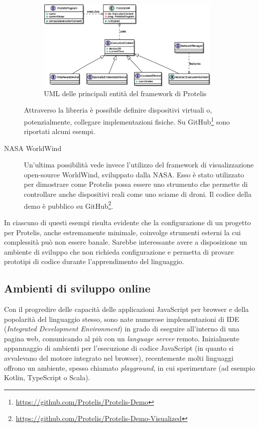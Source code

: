 \begin{description}
      \begin{figure}[htbp]
        \centering
        \includegraphics[width=0.87\textwidth]{res/uml/ExecutionContext.eps}%
        \caption{UML delle principali entità del framework di Protelis}%
        \label{fig:protelisvm}
      \end{figure}

      Attraverso la libreria è possibile definire dispositivi virtuali o, potenzialmente, collegare implementazioni fisiche.
      Su GitHub\footnote{\url{https://github.com/Protelis/Protelis-Demo}} sono riportati alcuni esempi.

    \item[NASA WorldWind]\cite{4161692}
      Un'ultima possibilità vede invece l'utilizzo del framework di visualizzazione open-source WorldWind, sviluppato dalla NASA\@.
      Esso è stato utilizzato per dimostrare come Protelis possa essere uno strumento che permette di controllare anche dispositivi reali come uno sciame di droni.
      Il codice della demo è pubblico su GitHub\footnote{\url{https://github.com/Protelis/Protelis-Demo-Visualized}}.
  \end{description}

  In ciascuno di questi esempi risulta evidente che la configurazione di un progetto per Protelis, anche estremamente minimale, coinvolge strumenti esterni la cui complessità può non essere banale.
  Sarebbe interessante avere a disposizione un ambiente di sviluppo che non richieda configurazione e permetta di provare prototipi di codice durante l'apprendimento del linguaggio.

  \subsection{Ambienti di sviluppo online}\label{subsec:online-ide}

  Con il progredire delle capacità delle applicazioni JavaScript per browser e della popolarità del linguaggio stesso, sono nate numerose implementazioni di IDE (\emph{Integrated Development Environment}) in grado di eseguire all'interno di una pagina web, comunicando al più con un \emph{language server} remoto.
  Inizialmente appannaggio di ambienti per l'esecuzione di codice JavaScript (in quanto si avvalevano del motore integrato nel browser), recentemente molti linguaggi offrono un ambiente, spesso chiamato \emph{playground}, in cui sperimentare (ad esempio Kotlin, TypeScript o Scala).

